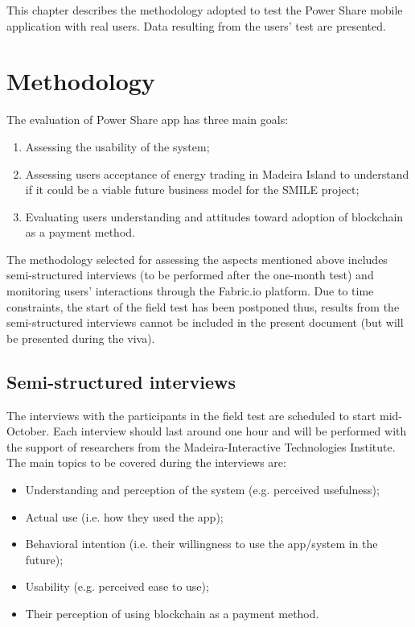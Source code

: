 \cleardoublepage
\label{chap:evaluation}
This chapter describes the methodology adopted to test the Power Share mobile application with real users. Data resulting from the users’ test are presented. 

\section{Methodology}

The evaluation of Power Share app has three main goals:


\begin{enumerate}
    \item Assessing the usability of the system;
    \item Assessing users acceptance of energy trading in Madeira Island to understand if it could be a viable future business model for the SMILE project;
    \item Evaluating users understanding and attitudes toward adoption of blockchain as a payment method.
\end{enumerate}


The methodology selected for assessing the aspects mentioned above includes semi-structured interviews (to be performed after the one-month test) and monitoring users’ interactions through the Fabric.io platform. Due to time constraints, the start of the field test has been postponed thus, results from the semi-structured interviews cannot be included in the present document (but will be presented during the viva). 


\subsection{Semi-structured interviews}

The interviews with the participants in the field test are scheduled to start mid-October. Each interview should last around one hour and will be performed with the support of researchers from the Madeira-Interactive Technologies Institute.
The main topics to be covered during the interviews are:
\begin{itemize}
    \item Understanding and perception of the system (e.g. perceived usefulness);
    \item Actual use (i.e. how they used the app);
    \item Behavioral intention (i.e. their willingness to use the app/system in the future);
    \item Usability (e.g. perceived ease to use);
    \item Their perception of using blockchain as a payment method.
\end{itemize}


